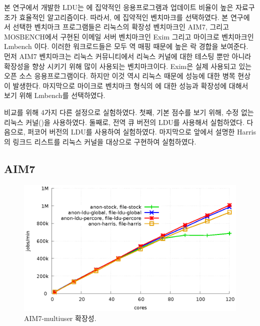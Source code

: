 
본 연구에서 개발한 LDU는 에 집약적인 응용프로그램과 업데이트 비율이 높은 
자료구조가 효율적인 알고리즘이다. 
따라서, 에 집약적인 벤치마크를 선택하였다. 
본 연구에서 선택한 벤치마크 프로그램들은 리눅스의 확장성 벤치마크인 AIM7, 그리고 MOSBENCH에서 
구현된 이메일 서버 벤치마크인 Exim 그리고 마이크로 벤치마크인 Lmbench 이다.
이러한 워크로드들은 모두 역 매핑 때문에 높은 락 경합을 보여준다. 
먼저 AIM7 벤치마크는 리눅스 커뮤니티에서 리눅스 커널에 대한 테스팅 뿐만 아니라 
확장성을 향상 시키기 위해 많이 사용되는 벤치마크이다.
Exim은 실제 사용되고 있는 오픈 소스 응용프로그램이다. 
하지만 이것 역시 리눅스  때문에 성능에 대한 병목 현상이 발생한다.
마지막으로 마이크로 벤치마크 형식의 에 대한 성능과 확장성에 대해서 보기 위해 
Lmbench를 선택하였다. 

비교를 위해 4가지 다른 설정으로 실험하였다. 
첫째, 기본 점수를 보기 위해, 수정 없는 리눅스 커널()을 사용하였다.
둘째로, 전역 큐 버전의 LDU를 사용해서 실험하였다.  
다음으로, 퍼코어 버전의 LDU를 사용하여 실험하였다. 
마지막으로 앞에서 설명한 Harris의  링크드 리스트를 리눅스 커널을 대상으로 
구현하여 실험하였다.  

\subsection{AIM7}

\begin{figure}[tb]
  \begin{center}
    \includegraphics[scale=1]{graph/aim7.eps}
  \end{center}
  \caption{AIM7-multiuser 확장성.}
  \label{fig:aim7}
\end{figure}

